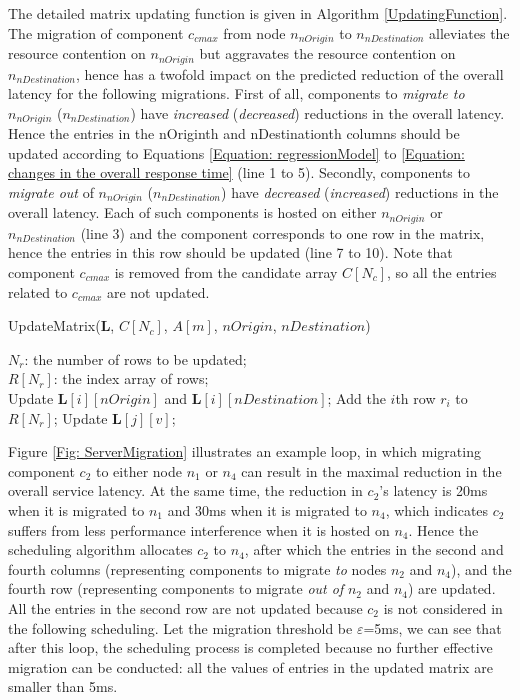 \documentclass[10pt, conference, compsocconf]{IEEEtran}
\begin{document}
The detailed matrix updating function is given in Algorithm \ref{UpdatingFunction}. The migration of component $c_{cmax}$ from node $n_{nOrigin}$ to $n_{nDestination}$ alleviates the resource contention on $n_{nOrigin}$ but aggravates the resource contention on $n_{nDestination}$, hence has a twofold impact on the predicted reduction of the overall latency for the following migrations. First of all, components to \emph{migrate to} $n_{nOrigin}$ ($n_{nDestination}$) have \emph{increased} (\emph{decreased}) reductions in the overall latency. Hence the entries in the nOriginth and nDestinationth columns should be updated according to Equations \ref{Equation: regressionModel} to \ref{Equation: changes in the overall response time} (line 1 to 5). Secondly, components to \emph{migrate out} of $n_{nOrigin}$ ($n_{nDestination}$) have \emph{decreased} (\emph{increased}) reductions in the overall latency. Each of such components is hosted on either $n_{nOrigin}$ or $n_{nDestination}$ (line 3) and the component corresponds to one row in the matrix, hence the entries in this row should be updated (line 7 to 10). Note that component $c_{cmax}$ is removed from the candidate array $C[N_c]$, so all the entries related to $c_{cmax}$ are not updated.

\begin{algorithm}[htbp]
\caption{UpdateMatrix($\textbf{L}$, $C[N_c]$, $A[m]$, $nOrigin$, $nDestination$)}
\label{UpdatingFunction}
\begin{algorithmic}[1]
\REQUIRE $N_r$: the number of rows to be updated;\\
$R[N_r]$: the index array of rows; \\
    \STATE Update $\textbf{L}[i][nOrigin]$ and $\textbf{L}[i][nDestination]$;
        \STATE Add the $i$th row $r_i$ to $R[N_r]$;
    \ENDIF
\ENDFOR
{}
        \STATE Update $\textbf{L}[j][v]$;
    \ENDFOR
\ENDFOR
\end{algorithmic}
\end{algorithm}

Figure \ref{Fig: ServerMigration} illustrates an example loop, in which migrating component $c_2$ to either node $n_1$ or $n_4$ can result in the maximal reduction in the overall service latency. At the same time, the reduction in $c_2$'s latency is 20ms when it is migrated to $n_1$ and 30ms when it is migrated to $n_4$, which indicates $c_2$ suffers from less performance interference when it is hosted on $n_4$. Hence the scheduling algorithm allocates $c_2$ to $n_4$, after which the entries in the second and fourth columns (representing components to migrate \emph{to} nodes $n_2$ and $n_4$), and the fourth row (representing components to migrate \emph{out of} $n_2$ and $n_4$) are updated. All the entries in the second row are not updated because $c_2$ is not considered in the following scheduling. Let the migration threshold be $\varepsilon$=5ms, we can see that after this loop, the scheduling process is completed because no further effective migration can be conducted: all the values of entries in the updated matrix are smaller than 5ms.
\end{document}
